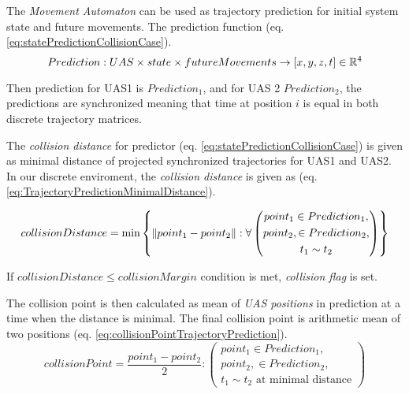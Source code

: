 The \emph{Movement Automaton} can be used as trajectory prediction for initial system state and future movements.  The prediction function (eq. \ref{eq:statePredictionCollisionCase}).
\begin{equation}\label{eq:statePredictionCollisionCase}
    Prediction: UAS \times state \times future Movements \to [x,y,z,t] \in \mathbb{R}^4
\end{equation}

\begin{note}
    Then prediction for UAS1 is $Prediction_1$, and for UAS 2 $Prediction_2$, the predictions are synchronized meaning that time at position $i$ is equal in both discrete trajectory matrices.
\end{note}

\noindent The \emph{collision distance} for predictor (eq. \ref{eq:statePredictionCollisionCase}) is given as minimal distance of projected synchronized trajectories for UAS1 and UAS2. In our discrete enviroment, the \emph{collision distance} is given as (eq. \ref{eq:TrajectoryPredictionMinimalDistance}).

\begin{equation}\label{eq:TrajectoryPredictionMinimalDistance}
    collisionDistance = \text{min}\left\{\left\lVert point_1-point_2\right\rVert:\forall \left(\begin{gathered}point_1 \in Prediction_1,\\ point_2, \in Prediction_2,\\ t_1 \sim t_2 \end{gathered}\right)\right\} 
\end{equation}

If $collisionDistance \le collision Margin$  condition is met, \emph{collision flag} is set.  

The collision point is then calculated  as mean of \emph{UAS positions} in prediction at a time when the distance is minimal.  The final collision point is arithmetic mean of two positions (eq. \ref{eq:collisionPointTrajectoryPrediction}).
\begin{equation}\label{eq:collisionPointTrajectoryPrediction}
    collisionPoint= \frac{point_1 - point_2}{2}:\left(\begin{gathered}point_1 \in Prediction_1,\\ point_2, \in Prediction_2,\\ t_1 \sim t_2 \text{ at minimal distance}\end{gathered}\right)
\end{equation}

